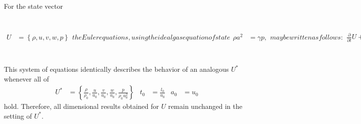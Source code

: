 \documentclass[letterpaper,11pt,nointlimits,reqno,draft]{amsart}
\begin{document}
For the state vector
\begin{subequations}
\label{eq:eulerprim}
\begin{align}
  U &= \left\{ \rho, u, v, w, p \right\}
\end{align}
the Euler equations, using the ideal gas equation of state
\begin{align}
  \rho a^2 &= \gamma p,
\end{align}
may be written as follows:
\begin{align}
    \frac{\partial}{\partial{}t}U
+ A \frac{\partial}{\partial{}x}U
+ B \frac{\partial}{\partial{}y}U
+ C \frac{\partial}{\partial{}z}U
&= 0
\end{align}
\begin{align}
 A &= \begin{bmatrix}
        u & \rho     & 0 & 0 & 0              \\
        0 & u        & 0 & 0 & \frac{1}{\rho} \\
        0 & 0        & u & 0 & 0              \\
        0 & 0        & 0 & u & 0              \\
        0 & \gamma p & 0 & 0 & u              \\
       \end{bmatrix}
&
 B &= \begin{bmatrix}
        v & 0 & \rho     & 0 & 0              \\
        0 & v & 0        & 0 & 0              \\
        0 & 0 & v        & 0 & \frac{1}{\rho} \\
        0 & 0 & 0        & v & 0              \\
        0 & 0 & \gamma p & 0 & v              \\
       \end{bmatrix}
&
 C &= \begin{bmatrix}
        w & 0 & 0 & \rho     & 0              \\
        0 & w & 0 & 0        & 0              \\
        0 & 0 & w & 0        & 0              \\
        0 & 0 & 0 & w        & \frac{1}{\rho} \\
        0 & 0 & 0 & \gamma p & w              \\
       \end{bmatrix}
\end{align}
\end{subequations}
This system of equations identically describes the behavior of an analogous
$U^*$ whenever all of
\begin{align}
\label{eq:eulerprimnondim}
U^{*} &= \left\{
  \frac{\rho}{\rho_0},
  \frac{u}{u_0},
  \frac{v}{u_0},
  \frac{w}{u_0},
  \frac{p}{\rho_0 u_0^2}
\right\}
&
t_0 &= \frac{l_0}{u_0}
&
a_0 &= u_0
\end{align}
hold.  Therefore, all dimensional results obtained for $U$ remain unchanged
in the setting of $U^*$.
\end{document}
